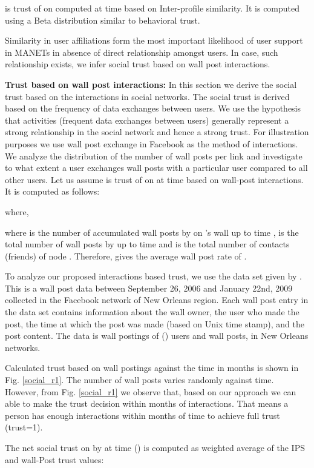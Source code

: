 \documentclass[conference]{IEEEtran}
\begin{document}
 is trust of  on  computed at time  based on Inter-profile similarity. It is computed using a Beta distribution similar to behavioral trust.


Similarity in user affiliations form the most important likelihood of user support in MANETs in absence of direct relationship  amongst users. In case, such relationship exists, we infer social trust based on wall post interactions.


{\bf Trust based on wall post interactions:}
In this section we derive the social trust based on the interactions in social networks. The social trust is derived based on the frequency of data exchanges between users. We use the hypothesis that activities (frequent data exchanges between users) generally represent a strong relationship in the social network and hence a strong trust. For illustration purposes we use wall post exchange in Facebook as the method of interactions. We analyze the distribution of the number of wall posts per link and investigate to what extent a user  exchanges wall posts with a particular user  compared to all other users. Let us assume  is trust of  on  at time  based on wall-post interactions. It is computed as follows:

where,


where  is the number of accumulated wall posts by  on 's wall up to time ,  is the total number of wall posts by  up to time  and  is the total number of contacts (friends) of node . Therefore,  gives the average wall post rate of .

To analyze our proposed interactions based trust, we use the data set given by \cite{Viswanath:2009, social_data_1}. This is a wall post data between September 26, 2006 and January 22nd, 2009 collected in the Facebook network of New Orleans region. Each wall post entry in the data set contains information about the wall owner, the user who made the post, the time at which the post was made (based on Unix time stamp), and the post content. The data is wall postings of  () users and  wall posts, in New Orleans networks.

 Calculated trust based on wall postings against the time in months is shown in Fig. \ref{social_r1}. The number of wall posts varies randomly against time. However, from  Fig. \ref{social_r1} we observe that, based on our approach we can able to make the trust decision within  months of interactions. That means a person has enough interactions within  months of time to achieve full trust (trust=1).

The net social trust on  by  at time  () is computed as weighted average of the IPS and wall-Post trust values:
\end{document}
